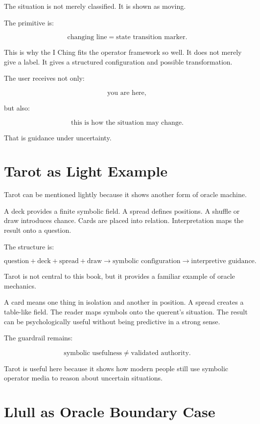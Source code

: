 \documentclass[11pt]{book}
\begin{document}
The situation is not merely classified. It is shown as moving.

The primitive is:

\[
\text{changing line} = \text{state transition marker}.
\]

This is why the I Ching fits the operator framework so well. It does not merely give a label. It gives a structured configuration and possible transformation.

The user receives not only:

\[
\text{you are here},
\]

but also:

\[
\text{this is how the situation may change}.
\]

That is guidance under uncertainty.

\section{Tarot as Light Example}

Tarot can be mentioned lightly because it shows another form of oracle machine.

A deck provides a finite symbolic field. A spread defines positions. A shuffle or draw introduces chance. Cards are placed into relation. Interpretation maps the result onto a question.

The structure is:

\[
\text{question}
+
\text{deck}
+
\text{spread}
+
\text{draw}
\rightarrow
\text{symbolic configuration}
\rightarrow
\text{interpretive guidance}.
\]

Tarot is not central to this book, but it provides a familiar example of oracle mechanics.

A card means one thing in isolation and another in position. A spread creates a table-like field. The reader maps symbols onto the querent's situation. The result can be psychologically useful without being predictive in a strong sense.

The guardrail remains:

\[
\text{symbolic usefulness} \neq \text{validated authority}.
\]

Tarot is useful here because it shows how modern people still use symbolic operator media to reason about uncertain situations.

\section{Llull as Oracle Boundary Case}
\end{document}
